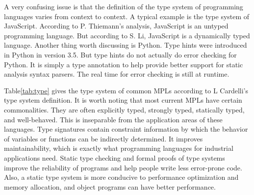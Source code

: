 A very confusing issue is that the definition of the type system of
programming languages varies from context to context.
A typical example is the type system of JavaScript.
According to P. Thiemann's analysis, JavaScript is an
untyped programming language\cite{thiemann2005towards}.
But according to S. Li, JavaScript is a dynamically
typed language\cite{dot2015analysis}.
Another thing worth discussing is Python.
Type hints were introduced in Python in version 3.5.
But type hints do not actually do error checking for Python.
It is simply a type annotation to help provide better support
for static analysis syntax parsers.
The real time for error checking is still at runtime.


Table\ref{tab:type} gives the type system of common MPLs according to L Cardelli's type system definition. It is worth noting that most current MPLs have certain commonalities. They are often explicitly typed, strongly typed, statically typed, and well-behaved. This is inseparable from the application areas of these languages. Type signatures contain constraint information by which the behavior of variables or functions can be indirectly determined. It improves maintainability, which is exactly what programming languages for industrial applications need. Static type checking and formal proofs of type systems improve the reliability of programs and help people write less error-prone code. Also, a static type system is more conducive to performance optimization and memory allocation, and object programs can have better performance.
